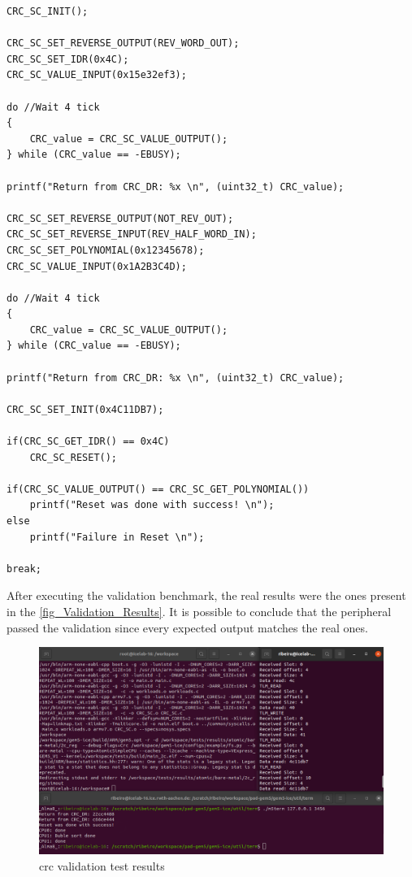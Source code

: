 \begin{lstlisting}[style=customC, caption={CRC validation code}, label=validationCodeCRC]
CRC_SC_INIT();

CRC_SC_SET_REVERSE_OUTPUT(REV_WORD_OUT);
CRC_SC_SET_IDR(0x4C);
CRC_SC_VALUE_INPUT(0x15e32ef3);       

do //Wait 4 tick
{
	CRC_value = CRC_SC_VALUE_OUTPUT();
} while (CRC_value == -EBUSY);

printf("Return from CRC_DR: %x \n", (uint32_t) CRC_value);

CRC_SC_SET_REVERSE_OUTPUT(NOT_REV_OUT);
CRC_SC_SET_REVERSE_INPUT(REV_HALF_WORD_IN);
CRC_SC_SET_POLYNOMIAL(0x12345678);
CRC_SC_VALUE_INPUT(0x1A2B3C4D);

do //Wait 4 tick
{
	CRC_value = CRC_SC_VALUE_OUTPUT();
} while (CRC_value == -EBUSY);

printf("Return from CRC_DR: %x \n", (uint32_t) CRC_value); 

CRC_SC_SET_INIT(0x4C11DB7);

if(CRC_SC_GET_IDR() == 0x4C)
	CRC_SC_RESET();

if(CRC_SC_VALUE_OUTPUT() == CRC_SC_GET_POLYNOMIAL())
	printf("Reset was done with success! \n");
else
	printf("Failure in Reset \n");

break;
\end{lstlisting}

After executing the validation benchmark, the real results were the ones present in the \autoref{fig_Validation_Results}. It is possible to 
conclude that the peripheral passed the validation since every expected output matches the real ones. 

\begin{figure}[H]
	\centering
 	\includegraphics[width=0.8\linewidth]{Images/Validation_Results.png} 
 	\caption{\gls{crc} validation test results}
	\label{fig_Validation_Results}
\end{figure}


